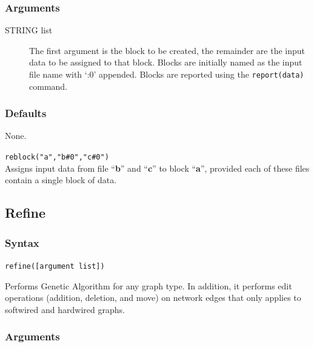 	\subsubsection{Arguments}
	\begin{description}
		\item [STRING list] The first argument is the block to be created, the remainder 
		are the input data to be assigned to that block. Blocks are initially named as the input 
		file name with `:0' appended. Blocks are reported using the \texttt{report(data)} command.
	\end{description}

	\subsubsection{Defaults}
		None.
	
	\begin{example}

		\item{\texttt{reblock("a","b\#0","c\#0")}\\ Assigns input data from file ``\textbf{b}'' and 
		``\textbf{c}'' to block ``\textbf{a}'', provided each of these files contain a single block 
		of data.}
	
	\end{example}

\subsection{Refine}
\label{subsec:refine}
	\subsubsection{Syntax}
		\texttt{refine([argument list])}
		
	\begin{phygdescription}
		{Performs Genetic Algorithm \citep{Holland1975} for any graph type. In addition, 
		it performs edit operations (addition, deletion, and move) on network edges that 
		only applies to softwired and hardwired graphs.}
	\end{phygdescription}

	\subsubsection{Arguments}
		
